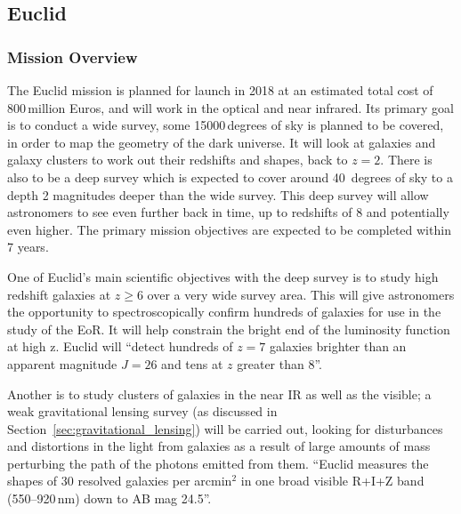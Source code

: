 
\subsection{Euclid} %
\label{sub:euclid}

	\subsubsection{Mission Overview} %
	\label{ssub:mission_overview}
		The Euclid mission is planned for launch in 2018\cite[p.~8]{Euclid_Definition_Study_Report} at an estimated total cost of 800\,million Euros, and will work in the optical and near infrared\cite{bbc_euclid}. Its primary goal is to conduct a wide survey, some 15000\,degrees of sky is planned to be covered, in order to map the geometry of the dark universe. It will look at galaxies and galaxy clusters to work out their redshifts and shapes, back to $z=2$. There is also to be a deep survey which is expected to cover around 40\, degrees of sky to a depth 2 magnitudes deeper than the wide survey. This deep survey will allow astronomers to see even further back in time, up to redshifts of 8 and potentially even higher. The primary mission objectives are expected to be completed within 7 years.

		One of Euclid's main scientific objectives with the deep survey is to study high redshift galaxies at $z\ge6$ over a very wide survey area. This will give astronomers the opportunity to spectroscopically confirm hundreds of galaxies for use in the study of the EoR. It will help constrain the bright end of the luminosity function at high z. Euclid will ``detect hundreds of $z=7$ galaxies brighter than an apparent magnitude $J=26$ and tens at $z$ greater than 8''\cite{Euclid_Definition_Study_Report}.

		Another is to study clusters of galaxies in the near IR as well as the visible; a weak gravitational lensing survey (as discussed in Section~\ref{sec:gravitational_lensing}) will be carried out, looking for disturbances and distortions in the light from galaxies as a result of large amounts of mass perturbing the path of the photons emitted from them. ``Euclid measures the shapes of 30 resolved galaxies per arcmin$^2$ in one broad visible R+I+Z band (550--920\,\si{\nano\metre}) down to AB mag 24.5''\cite[p.~9]{Euclid_Definition_Study_Report}.

